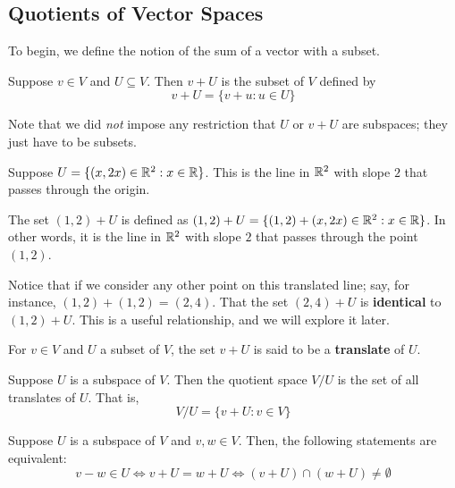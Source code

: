 \subsection*{Quotients of Vector Spaces}
To begin, we define the notion of the sum of a vector with a subset.
\begin{definition}
    Suppose $v\in V$ and $U\subseteq V$. Then $v + U$ is the subset of $V$ defined by
    \[ v + U = \{ v + u : u \in U \} \]
\end{definition}
Note that we did \textit{not} impose any restriction that $U$ or $v + U$ are subspaces; they just have to be subsets.
\begin{example}
    Suppose $U = \{(x,2x) \in \mathbb{R}^2 : x\in \mathbb{R}\}$. This is the line in $\mathbb{R}^2$ with slope $2$ that passes through the origin. 

    The set $(1, 2) + U$ is defined as $(1,2) + U = \{ (1,2) + (x,2x) \in \mathbb{R}^2 : x\in \mathbb{R}\}$. In other words, it is the line in $\mathbb{R}^2$ with slope $2$ that passes through the point $(1,2)$.

    Notice that if we consider any other point on this translated line; say, for instance, $(1,2) + (1,2) = (2, 4)$. That the set $(2,4) + U$ is \textbf{identical} to $(1,2) + U$. This is a useful relationship, and we will explore it later.
\end{example}
\begin{definition}[Translate]
    For $v\in V$ and $U$ a subset of $V$, the set $v + U$ is said to be a \textbf{translate} of $U$.
\end{definition}
\newpage
\begin{definition}
    Suppose $U$ is a subspace of $V$. Then the quotient space $V/U$ is the set of all translates of $U$. That is,
    \[ V/U = \{ v + U : v\in V \} \]
\end{definition}
\begin{theorem}
    Suppose $U$ is a subspace of $V$ and $v,w\in V$. Then, the following statements are equivalent:
    \[ v-w\in U \iff v + U = w + U \iff (v + U) \cap (w + U) \ne \emptyset \]
\end{theorem}
